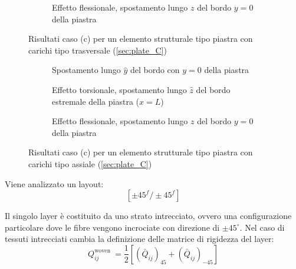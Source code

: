 \documentclass[a4paper,num-refs]{oup-contemporary}
\begin{document}
\begin{figure}[bt!]
\begin{subfigure}[t]{0.3\textwidth}
	\end{subfigure}
	\hfill
	\begin{subfigure}[t]{0.3\textwidth}
		\centering
		\caption{Effetto flessionale, spostamento lungo $z$ del bordo $y=0$ della piastra}
		
	\end{subfigure}
	\hfill
	\caption{Risultati caso (c) per un elemento strutturale tipo piastra con carichi tipo trasversale (\cref{sec:plate_C})}
	\label{fig:plate_C_transload_load}

	\centering
	
	\begin{subfigure}[t]{0.3\textwidth}
		\centering
		\caption{Spostamento lungo $\hat y$ del bordo con $y=0$ della piastra}
		
	\end{subfigure}
	\hfill
	\begin{subfigure}[t]{0.3\textwidth}
		\centering
		
		\caption{Effetto torsionale, spostamento lungo $\hat z$ del bordo estremale della piastra ($x=L$)}
		
	\end{subfigure}
	\hfill
	\begin{subfigure}[t]{0.3\textwidth}
		\centering
		\caption{Effetto flessionale, spostamento lungo $z$ del bordo $y=0$ della piastra}
		
	\end{subfigure}
	\hfill
	\caption{Risultati caso (c) per un elemento strutturale tipo piastra con carichi tipo assiale (\cref{sec:plate_C})}
	\label{fig:plate_C_axial_load}
\end{figure}

Viene analizzato un layout:
\begin{equation}
\left[\pm 45^{f} / \pm 45^{f}\right]
\end{equation}

Il singolo layer è costituito da uno strato intrecciato, ovvero una configurazione particolare dove le fibre vengono incrociate con direzione di $\pm 45^\circ$. Nel caso di tessuti intrecciati cambia la definizione delle matrice di rigidezza del layer:
\begin{equation}
Q_{i j}^{\text {woven }}=\frac{1}{2}\left[\left(\bar{Q}_{i j}\right)_{45}+\left(\bar{Q}_{i j}\right)_{-45}\right]
\end{equation}
\end{document}
